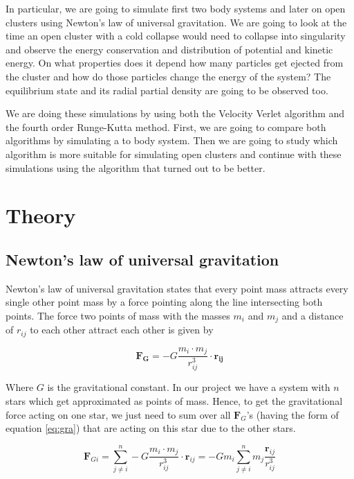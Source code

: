 \documentclass[10pt,a4paper]{article}
\begin{document}
In particular, we are going to simulate first two body systems and later on open clusters using Newton's law of universal gravitation. We are going to look at the time an open cluster with a cold collapse would need to collapse into singularity and observe the energy conservation and distribution of potential and kinetic energy. On what properties does it depend how many particles get ejected from the cluster and how do those particles change the energy of the system? The equilibrium state and its radial partial density are going to be observed too.

We are doing these simulations by using both the Velocity Verlet algorithm and the fourth order Runge-Kutta method. First, we are going to compare both algorithms by simulating a to body system. Then we are going to study which algorithm is more suitable for simulating open clusters and continue with these simulations using the algorithm that turned out to be better.
\section{Theory}

\subsection{Newton's law of universal gravitation}

Newton's law of universal gravitation states that every point mass attracts every single other point mass by a force pointing along the line intersecting both points. The force two points of mass with the masses $m_i$ and $m_j$ and a distance of $r_{ij}$ to each other attract each other is given by

\begin{equation}	
\label{eq:gra}
\mathbf{F_G} = - G \frac{m_i \cdot m_j}{r_{ij}^3} \cdot \mathbf{r_{ij}}
\end{equation}

Where $G$ is the gravitational constant. In our project we have a system with $n$ stars which get approximated as points of mass. Hence, to get the gravitational force acting on one star, we just need to sum over all $\mathbf{F}_G$'s (having the form of equation \eqref{eq:gra}) that are acting on this star due to the other stars.

\begin{equation}	
\label{eq:gra2}
\mathbf{F}_{Gi} = \sum_{j \neq i}^{n} - G \frac{m_i \cdot m_j}{r_{ij}^3} \cdot \mathbf{r}_{ij} = - G m_i \sum_{j \neq i}^{n} m_j \frac{\mathbf{r}_{ij}}{r_{ij}^3}
\end{equation}
\end{document}
